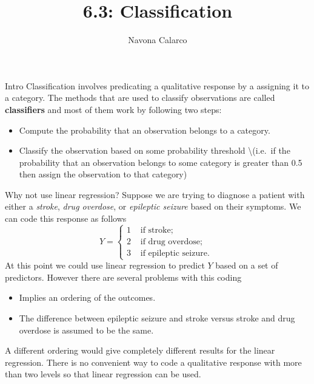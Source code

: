 \documentclass[
  ignorenonframetext,
  aspectratio=169,
]{beamer}
\title{6.3: Classification}
\author{Navona Calarco}
\date{}
\institute{The University of Toronto}
\begin{document}
\frame{\titlepage}
\ifdefined\Shaded\renewenvironment{Shaded}{\begin{tcolorbox}[sharp corners, enhanced, boxrule=0pt, interior hidden, frame hidden, borderline west={3pt}{0pt}{shadecolor}, breakable]}{\end{tcolorbox}}\fi

\begin{frame}{Intro}
\protect\hypertarget{intro}{}
Classification involves predicating a qualitative response by a
assigning it to a category. The methods that are used to classify
observations are called \textbf{classifiers} and most of them work by
following two steps:

\begin{itemize}
\item
  Compute the probability that an observation belongs to a category.
\item
  Classify the observation based on some probability threshold
  \textbackslash(i.e.~if the probability that an observation belongs to
  some category is greater than 0.5 then assign the observation to that
  category)
\end{itemize}
\end{frame}

\begin{frame}{Why not use linear regression?}
\protect\hypertarget{why-not-use-linear-regression}{}
Suppose we are trying to diagnose a patient with either a \emph{stroke},
\emph{drug overdose}, or \emph{epileptic seizure} based on their
symptoms. We can code this response as follows \[
    Y=\left\{\begin{array}{ll}
1 & \text { if stroke; } \\
2 & \text { if drug overdose; } \\
3 & \text { if epileptic seizure. }
\end{array}\right.
\] At this point we could use linear regression to predict \(Y\) based
on a set of predictors. However there are several problems with this
coding

\begin{itemize}
\item
  Implies an ordering of the outcomes.
\item
  The difference between epileptic seizure and stroke versus stroke and
  drug overdose is assumed to be the same.
\end{itemize}

A different ordering would give completely different results for the
linear regression.
\alert{There is no convenient way to code a qualitative response with more than two levels so that linear regression can be used.}
\end{frame}
\end{document}
